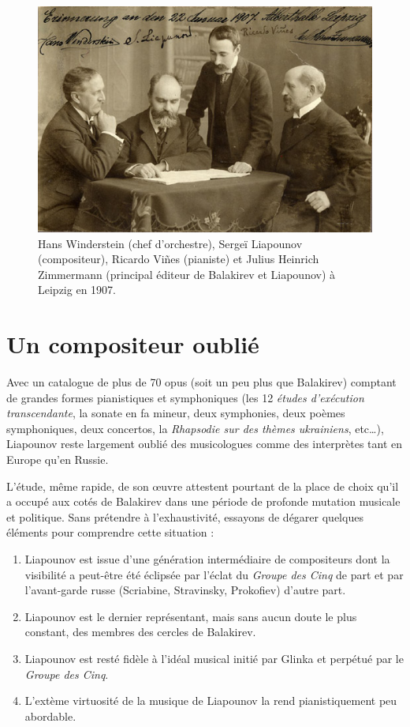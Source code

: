 \begin{figure}[!p]
  \begin{bigcenter}
    \includegraphics[width=14cm, keepaspectratio]{lyapunov-3.jpg}
  \end{bigcenter}
  \caption{\label{liapounov2}Hans Winderstein (chef d'orchestre), Sergeï Liapounov (compositeur), Ricardo Viñes (pianiste) et Julius Heinrich Zimmermann (principal éditeur de Balakirev et Liapounov) à Leipzig en 1907.}
\end{figure}

\newpage

\section{Un compositeur oublié}

Avec un catalogue de plus de 70 opus (soit un peu plus que Balakirev) comptant de grandes formes pianistiques et symphoniques (les 12 \emph{études d'exécution transcendante}, la sonate en fa mineur, deux symphonies, deux poèmes symphoniques, deux concertos, la \emph{Rhapsodie sur des thèmes ukrainiens}, etc\dots), Liapounov reste largement oublié des musicologues comme des interprètes tant en Europe qu'en Russie.

L'étude, même rapide, de son œuvre attestent pourtant de la place de choix qu'il a occupé aux cotés de Balakirev dans une période de profonde mutation musicale et politique. Sans prétendre à l'exhaustivité, essayons de dégarer quelques éléments pour comprendre cette situation :

\begin{enumerate}
  \item Liapounov est issue d'une génération intermédiaire de compositeurs dont la visibilité a peut-être été éclipsée par l'éclat du \emph{Groupe des Cinq} de part et par l’avant-garde russe (Scriabine, Stravinsky, Prokofiev) d'autre part.
  \item Liapounov est le dernier représentant, mais sans aucun doute le plus constant, des membres des cercles de Balakirev.
  \item Liapounov est resté fidèle à l'idéal musical initié par Glinka et perpétué par le \emph{Groupe des Cinq}.
  \item L'extème virtuosité de la musique de Liapounov la rend pianistiquement peu abordable.
\end{enumerate}



